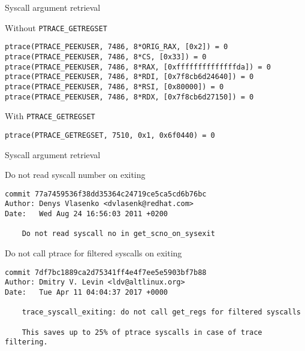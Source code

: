 \documentclass[unicode]{beamer}
\begin{document}
\begin{frame}[fragile]{Syscall argument retrieval}
\begin{block}{\large Without \texttt{PTRACE\_GETREGSET}}
\begin{scriptsize}
\begin{verbatim}
ptrace(PTRACE_PEEKUSER, 7486, 8*ORIG_RAX, [0x2]) = 0
ptrace(PTRACE_PEEKUSER, 7486, 8*CS, [0x33]) = 0
ptrace(PTRACE_PEEKUSER, 7486, 8*RAX, [0xffffffffffffffda]) = 0
ptrace(PTRACE_PEEKUSER, 7486, 8*RDI, [0x7f8cb6d24640]) = 0
ptrace(PTRACE_PEEKUSER, 7486, 8*RSI, [0x80000]) = 0
ptrace(PTRACE_PEEKUSER, 7486, 8*RDX, [0x7f8cb6d27150]) = 0
\end{verbatim}
\end{scriptsize}
\end{block}
\begin{block}{\large With \texttt{PTRACE\_GETREGSET}}
\begin{scriptsize}
\begin{verbatim}
ptrace(PTRACE_GETREGSET, 7510, 0x1, 0x6f0440) = 0
\end{verbatim}
\end{scriptsize}
\end{block}
\end{frame}

\begin{frame}[fragile]{Syscall argument retrieval}
\begin{block}{\large Do not read syscall number on exiting}
\begin{scriptsize}
\begin{verbatim}
commit 77a7459536f38dd35364c24719ce5ca5cd6b76bc
Author: Denys Vlasenko <dvlasenk@redhat.com>
Date:   Wed Aug 24 16:56:03 2011 +0200

    Do not read syscall no in get_scno_on_sysexit
\end{verbatim}
\end{scriptsize}
\end{block}

\begin{block}{\large Do not call ptrace for filtered syscalls on exiting}
\begin{scriptsize}
\begin{verbatim}
commit 7df7bc1889ca2d75341ff4e4f7ee5e5903bf7b88
Author: Dmitry V. Levin <ldv@altlinux.org>
Date:   Tue Apr 11 04:04:37 2017 +0000

    trace_syscall_exiting: do not call get_regs for filtered syscalls
    
    This saves up to 25% of ptrace syscalls in case of trace filtering.
\end{verbatim}
\end{scriptsize}
\end{block}
\end{frame}
\end{document}
